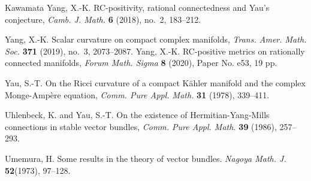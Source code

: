 \documentclass[12pt, reqno]{amsart}
\theoremstyle{plain}
\theoremstyle{definition}
\renewcommand{\>}{\rightarrow}
\renewcommand{\>}{\rightarrow}
\numberwithin{equation}{section} %
\begin{document}
\begin{thebibliography}{Kawamata}
	  Yang, X.-K.  RC-positivity, rational connectedness and Yau's conjecture, \emph{Camb. J. Math.} {\bf 6} (2018), no.~2, 183--212.
	
	Yang, X.-K.  Scalar curvature on compact complex manifolds,  \emph{Trans. Amer. Math. Soc.} {\bf 371} (2019), no.~3, 2073--2087.
    Yang, X.-K.  RC-positive metrics on rationally connected manifolds, \emph{Forum Math. Sigma} {\bf 8} (2020), Paper No. e53, 19 pp.




    Yau, S.-T.  On the Ricci curvature of a compact K\"ahler manifold and the complex Monge-Amp\`ere equation, \emph{Comm. Pure Appl. Math.} \textbf{31} (1978), 339--411.



    Uhlenbeck, K. and Yau, S.-T.  On the existence of Hermitian-Yang-Mills connections in stable vector bundles, \emph{Comm. Pure Appl. Math.} \textbf{39} (1986), 257--293.

    Umemura, H. Some results in the theory of vector bundles. \emph{Nagoya Math. J. } \textbf{52}(1973), 97--128.


\end{thebibliography}
\end{document}
